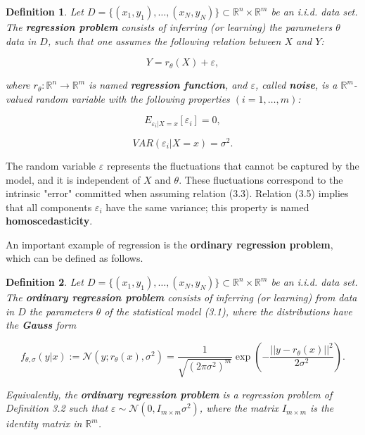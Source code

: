\documentclass{report}
\newtheorem{definition}{Definition}[chapter]
\begin{document}
\begin{definition}
Let $D = \{(x_1,y_1),\dots,(x_N,y_N)\} \subset \mathbb{R}^n \times \mathbb{R}^m$ be an i.i.d. data set. The \textbf{regression problem} consists of inferring (or learning) the parameters $\theta$ data in $D$, such that one assumes the following relation between $X$ and $Y$:

\begin{equation}
Y = r_\theta(X) + \varepsilon,
\end{equation}

where $r_\theta : \mathbb{R}^n \to \mathbb{R}^m$ is named \textbf{regression function}, and $\varepsilon$, called \textbf{noise}, is a $\mathbb{R}^m$-valued random variable with the following properties $(i = 1,\dots,m)$:

\begin{equation}
E_{\varepsilon_i|X = x}[\varepsilon_i] = 0,
\end{equation}

\begin{equation}
VAR(\varepsilon_i|X = x) = \sigma^2.
\end{equation}
\end{definition}

The random variable $\varepsilon$ represents the fluctuations that cannot be captured by the model, and it is independent of $X$ and $\theta$. These fluctuations correspond to the intrinsic "error" committed when assuming relation (3.3). Relation (3.5) implies that all components $\varepsilon_i$ have the same variance; this property is named \textbf{homoscedasticity}.

An important example of regression is the \textbf{ordinary regression problem}, which can be defined as follows.

\begin{definition}
Let $D = \{(x_1,y_1),\dots,(x_N,y_N)\} \subset \mathbb{R}^n \times \mathbb{R}^m$ be an i.i.d. data set. The \textbf{ordinary regression problem} consists of inferring (or learning) from data in $D$ the parameters $\theta$ of the statistical model (3.1), where the distributions have the \textbf{Gauss} form

\begin{equation}
f_{\theta,\sigma}(y|x) := \mathcal{N}(y;r_\theta(x),\sigma^2) = \frac{1}{\sqrt{(2\pi\sigma^2)^m}}\exp\left(-\frac{||y-r_\theta(x)||^2}{2\sigma^2}\right).
\end{equation}

Equivalently, the \textbf{ordinary regression problem} is a regression problem of Definition 3.2 such that $\varepsilon \sim \mathcal{N}(0,I_{m\times m}\sigma^2)$, where the matrix $I_{m\times m}$ is the identity matrix in $\mathbb{R}^m$.
\end{definition}
\end{document}

